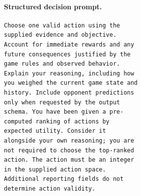 \paragraph{Structured decision prompt.}
\begin{verbatim}
Choose one valid action using the
supplied evidence and objective.
Account for immediate rewards and any
future consequences justified by the
game rules and observed behavior.
Explain your reasoning, including how
you weighed the current game state and
history. Include opponent predictions
only when requested by the output
schema. You have been given a pre-
computed ranking of actions by
expected utility. Consider it
alongside your own reasoning; you are
not required to choose the top-ranked
action. The action must be an integer
in the supplied action space.
Additional reporting fields do not
determine action validity.
\end{verbatim}

